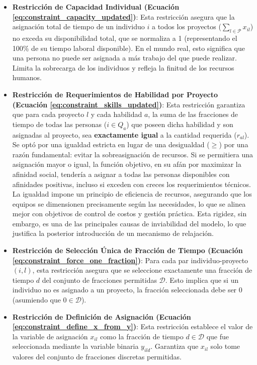 \documentclass[conference]{IEEEtran}
\begin{document}
\begin{itemize}
    \item \textbf{Restricción de Capacidad Individual (Ecuación \ref{eq:constraint_capacity_updated})}: Esta restricción asegura que la asignación total de tiempo de un individuo \(i\) a todos los proyectos (\(\sum_{l \in \mathcal{P}} x_{il}\)) no exceda su disponibilidad total, que se normaliza a 1 (representando el 100\% de su tiempo laboral disponible). En el mundo real, esto significa que una persona no puede ser asignada a más trabajo del que puede realizar. Limita la sobrecarga de los individuos y refleja la finitud de los recursos humanos.

    \item \textbf{Restricción de Requerimientos de Habilidad por Proyecto (Ecuación \ref{eq:constraint_skills_updated})}: Esta restricción garantiza que para cada proyecto \(l\) y cada habilidad \(a\), la suma de las fracciones de tiempo de todas las personas (\(i \in Q_a\)) que poseen dicha habilidad y son asignadas al proyecto, sea \textbf{exactamente igual} a la cantidad requerida (\(r_{al}\)). Se optó por una igualdad estricta en lugar de una desigualdad (\(\geq\)) por una razón fundamental: evitar la sobreasignación de recursos. Si se permitiera una asignación mayor o igual, la función objetivo, en su afán por maximizar la afinidad social, tendería a asignar a todas las personas disponibles con afinidades positivas, incluso si exceden con creces los requerimientos técnicos. La igualdad impone un principio de eficiencia de recursos, asegurando que los equipos se dimensionen precisamente según las necesidades, lo que se alinea mejor con objetivos de control de costos y gestión práctica. Esta rigidez, sin embargo, es una de las principales causas de inviabilidad del modelo, lo que justifica la posterior introducción de un mecanismo de relajación.

    \item \textbf{Restricción de Selección Única de Fracción de Tiempo (Ecuación \ref{eq:constraint_force_one_fraction})}: Para cada par individuo-proyecto \((i,l)\), esta restricción asegura que se seleccione exactamente una fracción de tiempo \(d\) del conjunto de fracciones permitidas \(\mathcal{D}\). Esto implica que si un individuo no es asignado a un proyecto, la fracción seleccionada debe ser 0 (asumiendo que \(0 \in \mathcal{D}\)).

    \item \textbf{Restricción de Definición de Asignación (Ecuación \ref{eq:constraint_define_x_from_y})}: Esta restricción establece el valor de la variable de asignación \(x_{il}\) como la fracción de tiempo \(d \in \mathcal{D}\) que fue seleccionada mediante la variable binaria \(y_{ild}\). Garantiza que \(x_{il}\) solo tome valores del conjunto de fracciones discretas permitidas.
\end{itemize}
\end{document}
